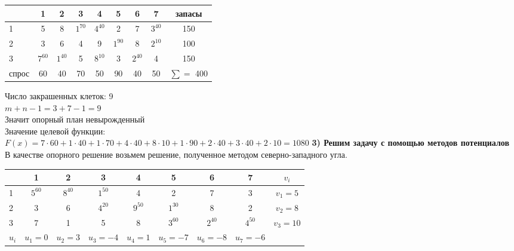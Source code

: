 \begin{center}
    \begin{tabular}{|a | c | c | c | c | c | c | c | c|} 
         \hline
            & 1 & 2 & 3 & 4 & 5 & 6 & 7 & запасы\\
          & 5 & 8 &  $1^{70}$ &  $4^{40}$ & 2 & 7 &  $3^{40}$ & 150\\
          & 3 & 6 & 4 & 9 &  $1^{90}$ & 8 &  $2^{10}$ & 100\\
          &  $7^{60}$ &  $1^{40}$ & 5 &  $8^{10}$ & 3 &  $2^{40}$ & 4 & 150\\
         \hline
            спрос & 60 & 40 & 70 & 50 & 90 & 40 & 50 & $\sum =$ 400\\
        \hline
    \end{tabular}
\end{center}

\begin{flushleft}
Число закрашенных клеток: 9\\
$m + n - 1 = 3 + 7 - 1 = 9$\\
Значит опорный план невырожденный\\
Значение целевой функции:\\
$F(x) = 7 \cdot 60 + 1 \cdot 40 + 1 \cdot 70 + 4 \cdot 40 + 8 \cdot 10 + 1 \cdot 90 + 2 \cdot 40 + 3 \cdot 40 + 2 \cdot 10 = 1080$
{\bf3) Решим задачу с помощью методов потенциалов}\\
В качестве опорного решение возьмем решение, полученное методом северно-западного угла.
\end{flushleft}

\begin{center}
    \begin{tabular}{|a | c | c | c | c | c | c | c | c|} 
         \hline
            & 1 & 2 & 3 & 4 & 5 & 6 & 7 & $v_{i}$\\
          &  $5^{60}$ &  $8^{40}$ &  $1^{50}$ & 4 & 2 & 7 & 3 & $v_1 = 5$\\
          & 3 & 6 &  $4^{20}$ &  $9^{50}$ &  $1^{30}$ & 8 & 2 & $v_2 = 8$\\
          & 7 & 1 & 5 & 8 &  $3^{60}$ &  $2^{40}$ &  $4^{50}$ & $v_3 = 10$\\
         \hline
            $u_{i}$ & $u_1 = 0$ & $u_2 = 3$ & $u_3 = -4$ & $u_4 = 1$ & $u_5 = -7$ & $u_6 = -8$ & $u_7 = -6$ & \\
        \hline
    \end{tabular}
\end{center}

